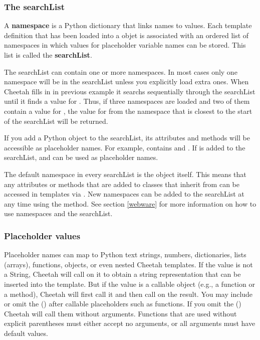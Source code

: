 \subsubsection{The searchList}
A {\bf namespace} is a Python dictionary that links names to values. Each
template definition that has been loaded into a  objet is
associated with an ordered list of namespaces in which values for placeholder
variable names can be stored.  This list is called the {\bf searchList}.

The searchList can contain one or more namespaces.  In most cases only one
namespace will be in the searchList unless you explicitly load extra ones.  When
Cheetah fills in  in previous example it searchs
sequentially through the searchList until it finds a value for .
Thus, if three namespaces are loaded and two of them contain a value for
, the value for  from the namespace that is
closest to the start of the searchList will be returned.

If you add a Python object to the searchList, its attributes and methods will be
accessible as placeholder names.  For example,  contains
 and .  If  is added to the
searchList,  and  can be used as placeholder
names.  

The default namespace in every searchList is the  object itself.
This means that any attributes or methods that are added to classes that inherit
from  can be accessed in templates via .  New
namespaces can be added to the searchList at any time using the
 method.  See section \ref{webware} for more
information on how to use namespaces and the searchList.

\subsubsection{Placeholder values}

Placeholder names can map to Python text strings, numbers, dictionaries, lists
(arrays), functions, objects, or even nested Cheetah templates.  If the value is
not a String, Cheetah will call  on it to obtain a string
representation that can be inserted into the template.  But if the value is a
callable object (e.g., a function or a method), Cheetah will first call it and
then call  on the result.  You may include or omit the () after
callable placeholders such as functions.  If you omit the () Cheetah will call
them without arguments.  Functions that are used without explicit parentheses
must either accept no arguments, or all arguments must have default values.

